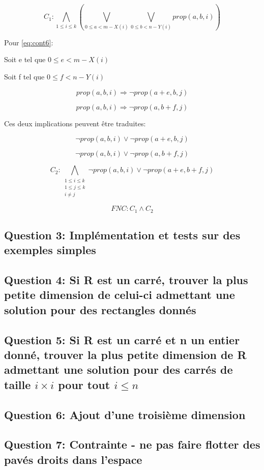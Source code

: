 \documentclass[a4paper,10pt]{article}
\begin{document}
$$C_1 : \bigwedge_{1 \leq i \leq k} ( \bigvee_{0 \leq a < m - X(i)} \bigvee_{0 \leq b < n - Y(i)} prop(a,b,i)) $$


Pour \eqref{eq:cont6}:

Soit e tel que $0 \leq e < m - X(i)$

Soit f tel que $0 \leq f < n - Y(i)$

$$prop(a,b,i) \Rightarrow \neg prop(a+e,b,j)$$

$$prop(a,b,i) \Rightarrow \neg prop(a,b+f,j)$$

Ces deux implications peuvent être traduites:

$$\neg prop(a,b,i) \lor \neg prop(a+e,b,j)$$

$$\neg prop(a,b,i) \lor \neg prop(a,b+f,j)$$

$$C_{2} : \bigwedge_{\substack{1 \leq i \leq k \\ 1 \leq j \leq k \\ i \neq j}} \neg prop(a,b,i) \lor \neg prop(a+e,b+f,j)$$


\begin{center}
$$FNC: C_1 \wedge C_2$$
\end{center}

\subsection{Question 3: Implémentation et tests sur des exemples simples}

\subsection{Question 4: Si R est un carré, trouver la plus petite dimension de celui-ci admettant une solution pour des rectangles donnés}

\subsection{Question 5: Si R est un carré et n un entier donné, trouver la plus petite dimension de R admettant une solution pour des carrés de taille $i \times i$ pour tout $i \leq n$}

\subsection{Question 6: Ajout d'une troisième dimension}

\newpage

\subsection{Question 7: Contrainte - ne pas faire flotter des pavés droits dans l'espace}
\end{document}
